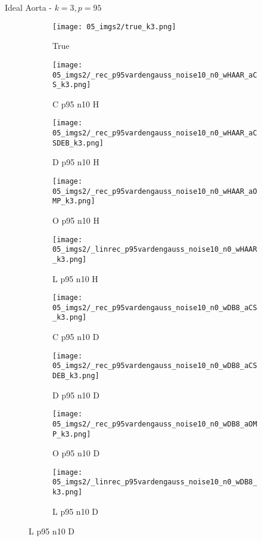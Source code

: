 \begin{frame}{Ideal Aorta - $k=3,p=95$}{}
\begin{figure}
\begin{subfigure}{0.1\textwidth}
\texttt{[image: 05\_imgs2/true\_k3.png]}
\caption*{\Tiny True}
\end{subfigure}
\begin{subfigure}{0.1\textwidth}
\texttt{[image: 05\_imgs2/\_rec\_p95vardengauss\_noise10\_n0\_wHAAR\_aCS\_k3.png]}
\caption*{\Tiny C p95 n10 H}
\end{subfigure}
\begin{subfigure}{0.1\textwidth}
\texttt{[image: 05\_imgs2/\_rec\_p95vardengauss\_noise10\_n0\_wHAAR\_aCSDEB\_k3.png]}
\caption*{\Tiny D p95 n10 H}
\end{subfigure}
\begin{subfigure}{0.1\textwidth}
\texttt{[image: 05\_imgs2/\_rec\_p95vardengauss\_noise10\_n0\_wHAAR\_aOMP\_k3.png]}
\caption*{\Tiny O p95 n10 H}
\end{subfigure}
\begin{subfigure}{0.1\textwidth}
\texttt{[image: 05\_imgs2/\_linrec\_p95vardengauss\_noise10\_n0\_wHAAR\_k3.png]}
\caption*{\Tiny L p95 n10 H}
\end{subfigure}
\begin{subfigure}{0.1\textwidth}
\texttt{[image: 05\_imgs2/\_rec\_p95vardengauss\_noise10\_n0\_wDB8\_aCS\_k3.png]}
\caption*{\Tiny C p95 n10 D}
\end{subfigure}
\begin{subfigure}{0.1\textwidth}
\texttt{[image: 05\_imgs2/\_rec\_p95vardengauss\_noise10\_n0\_wDB8\_aCSDEB\_k3.png]}
\caption*{\Tiny D p95 n10 D}
\end{subfigure}
\begin{subfigure}{0.1\textwidth}
\texttt{[image: 05\_imgs2/\_rec\_p95vardengauss\_noise10\_n0\_wDB8\_aOMP\_k3.png]}
\caption*{\Tiny O p95 n10 D}
\end{subfigure}
\begin{subfigure}{0.1\textwidth}
\texttt{[image: 05\_imgs2/\_linrec\_p95vardengauss\_noise10\_n0\_wDB8\_k3.png]}
\caption*{\Tiny L p95 n10 D}
\end{subfigure}

\vspace{5pt}


\end{figure}
\end{frame}

